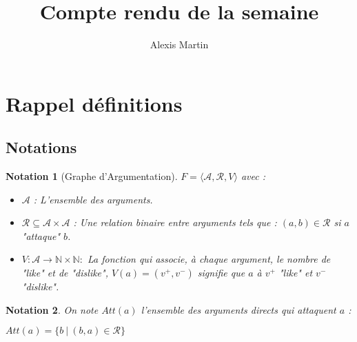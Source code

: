 \documentclass[12pt]{article}
\title{Compte rendu de la semaine}
\author{Alexis Martin}
\theoremstyle{defi}
\theoremstyle{not}
\newtheorem{notation}{Notation}
\theoremstyle{prob}
\begin{document}
\maketitle

\section{Rappel définitions}
  \subsection{Notations}
    \begin{notation}[Graphe d'Argumentation]

      $F = \langle \mathcal{A}, \mathcal{R}, V \rangle$ avec :
      \begin{itemize}
        \item $\mathcal{A}$ : L'ensemble des arguments.
        \item $\mathcal{R} \subseteq \mathcal{A} \times \mathcal{A}$ : Une relation binaire entre arguments tels que : $(a,b) \in \mathcal{R}$ si $a$ "attaque" $b$.
        \item $V: \mathcal{A} \rightarrow \mathbb{N} \times \mathbb{N} :$ La fonction qui associe, à chaque argument, le nombre de "like" et de "dislike", $V(a) = (v^+, v^-)$ signifie que $a$ à $v^+$ "like" et $v^-$ "dislike".
      \end{itemize}
    \end{notation}

    \begin{notation}
      On note $Att(a)$ l'ensemble des arguments directs qui attaquent $a$ :

      $Att(a) = \{b\ |\ (b, a)\in \mathcal{R}\}$
    \end{notation}
\end{document}
